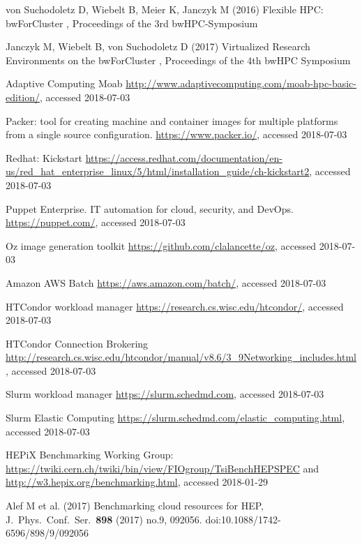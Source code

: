\begin{thebibliography}{}
 von Suchodoletz D,  Wiebelt B,  Meier K,  Janczyk M (2016)
  Flexible HPC: bwForCluster \NEMO,
  Proceedings of the 3rd bwHPC-Symposium %

 Janczyk M,  Wiebelt B, von Suchodoletz D (2017)
  Virtualized Research Environments on the bwForCluster \NEMO,
  Proceedings of the 4th bwHPC Symposium 


Adaptive Computing Moab
\url{http://www.adaptivecomputing.com/moab-hpc-basic-edition/}, accessed 2018-07-03

Packer: tool for creating machine and container images for multiple platforms from a single source configuration. 
\url{https://www.packer.io/}, accessed 2018-07-03

 Redhat: Kickstart
\url{https://access.redhat.com/documentation/en-us/red_hat_enterprise_linux/5/html/installation_guide/ch-kickstart2}, accessed 2018-07-03

Puppet Enterprise. IT automation for cloud, security, and DevOps.
\url{https://puppet.com/}, accessed 2018-07-03


Oz image generation toolkit
\url{https://github.com/clalancette/oz}, accessed 2018-07-03

Amazon AWS Batch
\url{https://aws.amazon.com/batch/}, accessed 2018-07-03

HTCondor workload manager
\url{https://research.cs.wisc.edu/htcondor/}, accessed 2018-07-03

HTCondor Connection Brokering
\url{http://research.cs.wisc.edu/htcondor/manual/v8.6/3_9Networking_includes.html}, accessed 2018-07-03

  Slurm workload manager
  \url{https://slurm.schedmd.com}, accessed 2018-07-03
    
Slurm Elastic Computing
\url{https://slurm.schedmd.com/elastic_computing.html}, accessed 2018-07-03


 HEPiX Benchmarking Working Group:
\url{https://twiki.cern.ch/twiki/bin/view/FIOgroup/TsiBenchHEPSPEC}
and \url{http://w3.hepix.org/benchmarking.html}, accessed 2018-01-29



Alef M  et al. (2017) Benchmarking cloud resources for HEP,
J.\ Phys.\ Conf.\ Ser.\  {\bf 898} (2017) no.9,  092056.
doi:10.1088/1742-6596/898/9/092056



\end{thebibliography}
